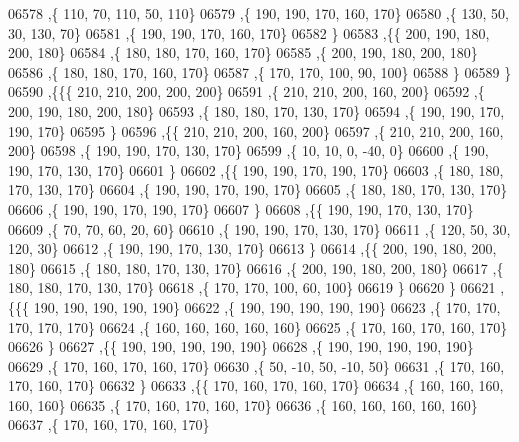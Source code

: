 \begin{DoxyCode}
06578     ,\{   110,    70,   110,    50,   110\}
06579     ,\{   190,   190,   170,   160,   170\}
06580     ,\{   130,    50,    30,   130,    70\}
06581     ,\{   190,   190,   170,   160,   170\}
06582     \}
06583    ,\{\{   200,   190,   180,   200,   180\}
06584     ,\{   180,   180,   170,   160,   170\}
06585     ,\{   200,   190,   180,   200,   180\}
06586     ,\{   180,   180,   170,   160,   170\}
06587     ,\{   170,   170,   100,    90,   100\}
06588     \}
06589    \}
06590   ,\{\{\{   210,   210,   200,   200,   200\}
06591     ,\{   210,   210,   200,   160,   200\}
06592     ,\{   200,   190,   180,   200,   180\}
06593     ,\{   180,   180,   170,   130,   170\}
06594     ,\{   190,   190,   170,   190,   170\}
06595     \}
06596    ,\{\{   210,   210,   200,   160,   200\}
06597     ,\{   210,   210,   200,   160,   200\}
06598     ,\{   190,   190,   170,   130,   170\}
06599     ,\{    10,    10,     0,   -40,     0\}
06600     ,\{   190,   190,   170,   130,   170\}
06601     \}
06602    ,\{\{   190,   190,   170,   190,   170\}
06603     ,\{   180,   180,   170,   130,   170\}
06604     ,\{   190,   190,   170,   190,   170\}
06605     ,\{   180,   180,   170,   130,   170\}
06606     ,\{   190,   190,   170,   190,   170\}
06607     \}
06608    ,\{\{   190,   190,   170,   130,   170\}
06609     ,\{    70,    70,    60,    20,    60\}
06610     ,\{   190,   190,   170,   130,   170\}
06611     ,\{   120,    50,    30,   120,    30\}
06612     ,\{   190,   190,   170,   130,   170\}
06613     \}
06614    ,\{\{   200,   190,   180,   200,   180\}
06615     ,\{   180,   180,   170,   130,   170\}
06616     ,\{   200,   190,   180,   200,   180\}
06617     ,\{   180,   180,   170,   130,   170\}
06618     ,\{   170,   170,   100,    60,   100\}
06619     \}
06620    \}
06621   ,\{\{\{   190,   190,   190,   190,   190\}
06622     ,\{   190,   190,   190,   190,   190\}
06623     ,\{   170,   170,   170,   170,   170\}
06624     ,\{   160,   160,   160,   160,   160\}
06625     ,\{   170,   160,   170,   160,   170\}
06626     \}
06627    ,\{\{   190,   190,   190,   190,   190\}
06628     ,\{   190,   190,   190,   190,   190\}
06629     ,\{   170,   160,   170,   160,   170\}
06630     ,\{    50,   -10,    50,   -10,    50\}
06631     ,\{   170,   160,   170,   160,   170\}
06632     \}
06633    ,\{\{   170,   160,   170,   160,   170\}
06634     ,\{   160,   160,   160,   160,   160\}
06635     ,\{   170,   160,   170,   160,   170\}
06636     ,\{   160,   160,   160,   160,   160\}
06637     ,\{   170,   160,   170,   160,   170\}

\end{DoxyCode}
